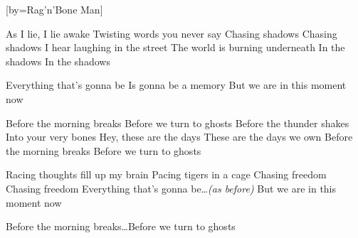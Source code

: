 


[by=Rag'n'Bone Man]

\beginverse*
{\nolyrics Jam chart (approx.): \[Em] \[C] \[G] \[D] \quad (Loop)}
\endverse

\beginverse
As I lie, I lie awake \brk  Twisting words you never say
Chasing shadows \brk  Chasing shadows
I hear laughing in the street \brk  The world is burning underneath
In the shadows \brk  In the shadows
\endverse

\beginverse
Everything that's gonna be \brk  Is gonna be a memory
But we are in this moment now
\endverse

\beginchorus
Before the morning breaks \brk  Before we turn to ghosts
Before the thunder shakes \brk  Into your very bones
Hey, these are the days \brk  These are the days we own
Before the morning breaks \brk  Before we turn to ghosts
\endchorus

\beginverse
Racing thoughts fill up my brain \brk  Pacing tigers in a cage
Chasing freedom \brk  Chasing freedom
Everything that's gonna be\ldots \emph{(as before)}
But we are in this moment now
\endverse

\beginchorus
{} Before the morning breaks\ldots Before we turn to ghosts
\endchorus

\endsong
